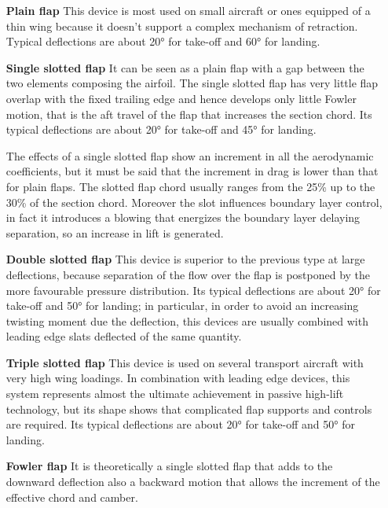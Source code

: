 \begin{itemize}
\item [\textbf{Plain flap}] This device is most used on small aircraft or ones equipped of a thin wing because it doesn’t support a complex mechanism of retraction. Typical deflections are about 20° for take-off and 60° for landing.
\item [\textbf{Single slotted flap}]  It can be seen as a plain flap with a gap between the two elements composing the airfoil. The single slotted flap has very little flap overlap with the fixed trailing edge and hence develops only little Fowler motion, that is the aft travel of the flap that increases the section chord. Its typical deflections are about 20° for take-off and 45° for landing.

The effects of a single slotted flap show an increment in all the aerodynamic coefficients, but it must be said that the increment in drag is lower than that for plain flaps. The slotted flap chord usually ranges from the 25\% up to the 30\% of the section chord. Moreover the slot influences boundary layer control, in fact it introduces a blowing that energizes the boundary layer delaying separation, so an increase in lift is generated.
\item[\textbf{Double slotted flap}] This device is superior to the previous type at large deflections, because separation of the flow over the flap is postponed by the more favourable pressure distribution. Its typical deflections are about 20° for take-off and 50° for landing; in particular, in order to avoid an increasing twisting moment due the deflection, this devices are usually combined with leading edge slats deflected of the same quantity. 
\item[\textbf{Triple slotted flap}] This device is used on several transport aircraft with very high wing loadings. In combination with leading edge devices, this system represents almost the ultimate achievement in passive high-lift technology, but its shape shows that complicated flap supports and controls are required. Its typical deflections are about 20° for take-off and 50° for landing.
\item[\textbf{Fowler flap}]  It is theoretically a single slotted flap that adds to the downward deflection also a backward motion that allows the increment of the effective chord and camber.


\end{itemize}
